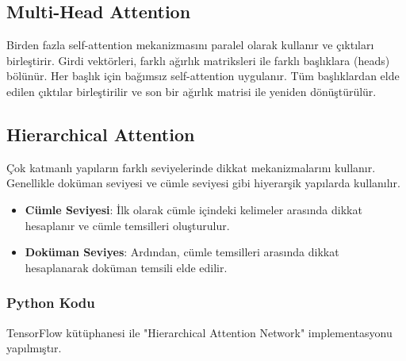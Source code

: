 \subsection{Multi-Head Attention}
Birden fazla self-attention mekanizmasını paralel olarak kullanır ve çıktıları birleştirir. Girdi vektörleri, farklı ağırlık matriksleri ile farklı başlıklara (heads) bölünür. Her başlık için bağımsız self-attention uygulanır. Tüm başlıklardan elde edilen çıktılar birleştirilir ve son bir ağırlık matrisi ile yeniden dönüştürülür.

\subsection{Hierarchical Attention}
Çok katmanlı yapıların farklı seviyelerinde dikkat mekanizmalarını kullanır. Genellikle doküman seviyesi ve cümle seviyesi gibi hiyerarşik yapılarda kullanılır.

\begin{itemize}
	\item \textbf{Cümle Seviyesi}: İlk olarak cümle içindeki kelimeler arasında dikkat hesaplanır ve cümle temsilleri oluşturulur.
	\item \textbf{Doküman Seviyes}: Ardından, cümle temsilleri arasında dikkat hesaplanarak doküman temsili elde edilir.
\end{itemize}

\subsubsection{Python Kodu}

TensorFlow kütüphanesi ile "Hierarchical Attention Network" implementasyonu yapılmıştır.

